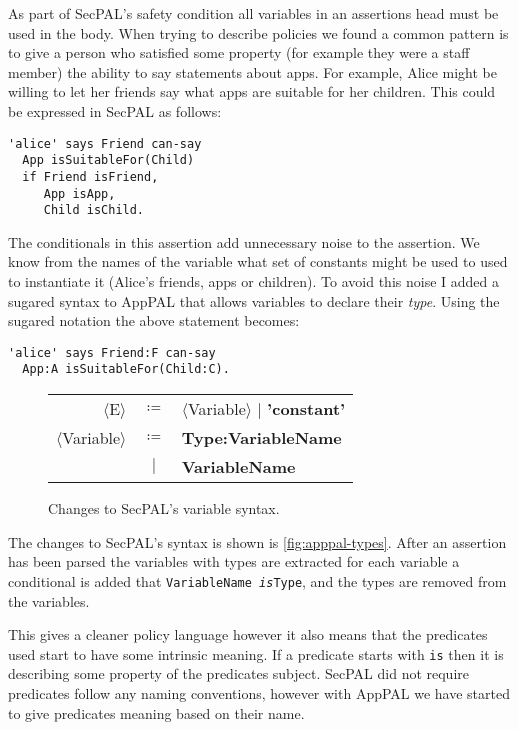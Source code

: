 \documentclass[a4paper]{scrartcl}
\begin{document}
As part of SecPAL's safety condition all variables in an assertions head must be
used in the body.  When trying to describe policies we found a common pattern is
to give a person who satisfied some property (for example they were a staff
member) the ability to say statements about apps.
For example, Alice might be willing to let her friends say what apps are
suitable for her children.  This could be expressed in SecPAL as follows:
\begin{lstlisting}
'alice' says Friend can-say
  App isSuitableFor(Child)
  if Friend isFriend,
     App isApp,
     Child isChild.
\end{lstlisting}
The conditionals in this assertion add unnecessary noise to the assertion. We
know from the names of the variable what set of constants might be used to used
to instantiate it (Alice's friends, apps or children). To avoid this noise I
added a sugared syntax to AppPAL that allows variables to declare their
\emph{type}.  Using the sugared notation the above statement becomes:
\begin{lstlisting}
'alice' says Friend:F can-say
  App:A isSuitableFor(Child:C).
\end{lstlisting}
\begin{figure}
  \newcommand{\nonterminal}[1]{$\langle$#1$\rangle$}
  \newcommand{\terminal}[1]{\textbf{#1}}
  \begin{tabular}{r c l}
    \footnotesize
    \nonterminal{E}         & $\coloneqq$ & \nonterminal{Variable} $\vert$ \terminal{'constant'} \\
    \nonterminal{Variable}  & $\coloneqq$ & \terminal{Type}\terminal{:}\terminal{VariableName} \\
                            & $\vert$     & \terminal{VariableName}
  \end{tabular}
  \caption{Changes to SecPAL's variable syntax.}
  \label{fig:apppal-types}
\end{figure}
The changes to SecPAL's syntax is shown is \autoref{fig:apppal-types}.
After an assertion has been parsed the variables with types are extracted for
each variable a conditional is added that \texttt{VariableName \emph{is}Type},
and the types are removed from the variables.

This gives a cleaner policy language however it also means that the predicates
used start to have some intrinsic meaning.  If a predicate starts with
\texttt{is} then it is describing some property of the predicates subject.
SecPAL did not require predicates follow any naming conventions, however with
AppPAL we have started to give predicates meaning based on their name.
\end{document}
